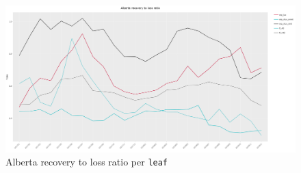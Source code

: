 \begin{figure}[H]
	\begin{center}
		\includegraphics[scale=0.14]{Graphiques/AB_recovery_loss} 
		\renewcommand{\figurename}{Figure}
		\caption{Alberta recovery to loss ratio per \texttt{leaf}}\label{Fig_AB_recovery_loss}
	\end{center}
\end{figure}

	